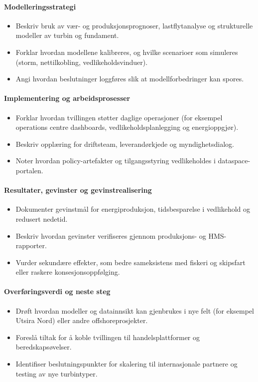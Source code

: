 \paragraph{Modelleringsstrategi}
\begin{itemize}
    \item Beskriv bruk av vær- og produksjonsprognoser, lastflytanalyse og strukturelle modeller av turbin og fundament.
    \item Forklar hvordan modellene kalibreres, og hvilke scenarioer som simuleres (storm, nettilkobling, vedlikeholdsvinduer).
    \item Angi hvordan beslutninger loggføres slik at modellforbedringer kan spores.
\end{itemize}

\paragraph{Implementering og arbeidsprosesser}
\begin{itemize}
    \item Forklar hvordan tvillingen støtter daglige operasjoner (for eksempel operations centre dashboards, vedlikeholdsplanlegging og energioppgjør).
    \item Beskriv opplæring for driftsteam, leverandørkjede og myndighetsdialog.
    \item Noter hvordan policy-artefakter og tilgangsstyring vedlikeholdes i dataspace-portalen.\citep{gaiax2023architecture}
\end{itemize}

\paragraph{Resultater, gevinster og gevinstrealisering}
\begin{itemize}
    \item Dokumenter gevinstmål for energiproduksjon, tidsbesparelse i vedlikehold og redusert nedetid.
    \item Beskriv hvordan gevinster verifiseres gjennom produksjons- og HMS-rapporter.
    \item Vurder sekundære effekter, som bedre sameksistens med fiskeri og skipsfart eller raskere konsesjonsoppfølging.
\end{itemize}

\paragraph{Overføringsverdi og neste steg}
\begin{itemize}
    \item Drøft hvordan modeller og datainnsikt kan gjenbrukes i nye felt (for eksempel Utsira Nord) eller andre offshoreprosjekter.
    \item Foreslå tiltak for å koble tvillingen til handelsplattformer og beredskapsøvelser.
    \item Identifiser beslutningspunkter for skalering til internasjonale partnere og testing av nye turbintyper.
\end{itemize}

